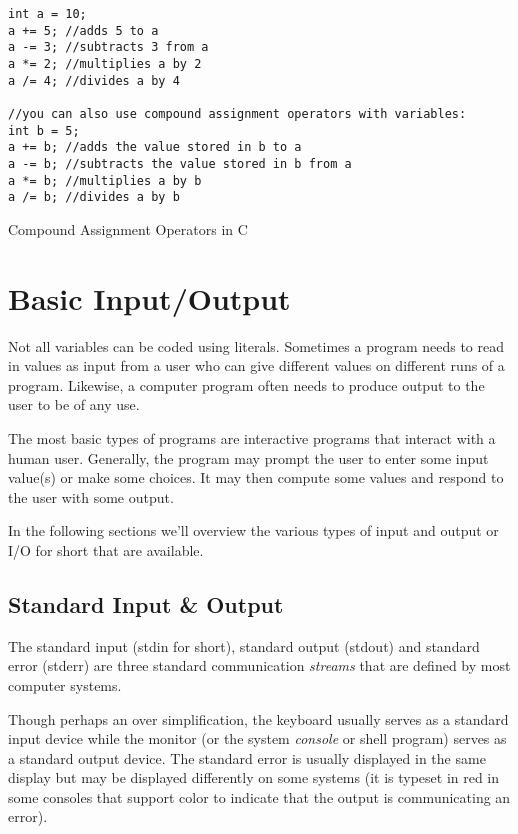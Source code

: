 \begin{listing}
\begin{verbatim}
int a = 10;
a += 5; //adds 5 to a
a -= 3; //subtracts 3 from a
a *= 2; //multiplies a by 2
a /= 4; //divides a by 4

//you can also use compound assignment operators with variables:
int b = 5;
a += b; //adds the value stored in b to a
a -= b; //subtracts the value stored in b from a
a *= b; //multiplies a by b
a /= b; //divides a by b
\end{verbatim}
\caption{Compound Assignment Operators in C}
\label{code:compoundAssignmentOperatorsInC}
\end{listing}

\section{Basic Input/Output}

Not all variables can be coded using literals.  Sometimes a program
needs to read in values as \gls{input} from a user who can give
different values on different runs of a program.  Likewise, a computer
program often needs to produce \gls{output} to the user to be
of any use.  

The most basic types of programs are \gls{interactive} programs that
interact with a human user.  Generally, the program may \gls{prompt} the
user to enter some input value(s) or make some choices.  It may then
compute some values and respond to the user with some output.

In the following sections we'll overview the various types of input
and output or I/O for short that are available.

\subsection{Standard Input \& Output}

The standard input (stdin for short), standard output (stdout) and standard error
(stderr) are three standard communication \emph{streams} that are defined by
most computer systems.

Though perhaps an over simplification, the keyboard usually serves as a 
standard input device while the monitor (or the system \emph{console} or 
shell program) serves as a 
standard output device.  The standard error is usually displayed in the same
display but may be displayed differently on some systems (it is typeset in red
in some consoles that support color to indicate that the output is communicating
an error).

